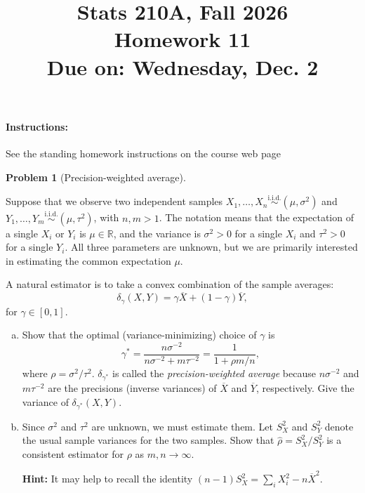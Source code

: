 \documentclass{article}
\newcommand{\RR}{\mathbb{R}}
\newcommand{\simiid}{\overset{\text{i.i.d.}}{\sim}}
\theoremstyle{definition}
\newtheorem{problem}{Problem}
\begin{document}
\title{Stats 210A, Fall 2026\\
  Homework 11 \\
  {\large {\bf Due on}: Wednesday, Dec. 2}}
\date{}

\maketitle

\paragraph{Instructions:} See the standing homework instructions on the course web page


\begin{problem}[Precision-weighted average]
\label{prob:prec-weights}

 Suppose that we observe two independent samples $X_1,\ldots,X_n\simiid (\mu, \sigma^2)$ and $Y_1,\ldots,Y_m \simiid (\mu, \tau^2)$, with $n,m> 1$. The notation means that the expectation of a single $X_i$ or $Y_i$ is $\mu\in \RR$, and the variance is $\sigma^2>0$ for a single $X_i$ and $\tau^2>0$ for a single $Y_i$. All three parameters are unknown, but we are primarily interested in estimating the common expectation $\mu$.

A natural estimator is to take a convex combination of the sample averages:
\[
\delta_\gamma(X,Y) = \gamma \overline X + (1-\gamma) \overline Y,
\]
for $\gamma \in [0,1]$.

\begin{enumerate}[(a)]

\item Show that the optimal (variance-minimizing) choice of $\gamma$ is
\[
\gamma^* = \frac{n\sigma^{-2}}{n\sigma^{-2}+m\tau^{-2}} = \frac{1}{1+\rho m/n},
\]
where $\rho = \sigma^2/\tau^2$. $\delta_{\gamma^*}$ is called the {\em precision-weighted average} because $n\sigma^{-2}$ and $m\tau^{-2}$ are the precisions (inverse variances) of $\overline{X}$ and $\overline{Y}$, respectively. Give the variance of $\delta_{\gamma^*}(X,Y)$.



\item Since $\sigma^2$ and $\tau^2$ are unknown, we must estimate them. Let $S_X^2$ and $S_Y^2$ denote the usual sample variances for the two samples. Show that $\hat\rho = S_X^2/S_Y^2$ is a consistent estimator for $\rho$ as $m,n \to \infty$.

{\bf Hint:} It may help to recall the identity $(n-1)S_X^2 = \sum_i X_i^2 - n\overline{X}^2$.


\end{enumerate}
\end{problem}
\end{document}
